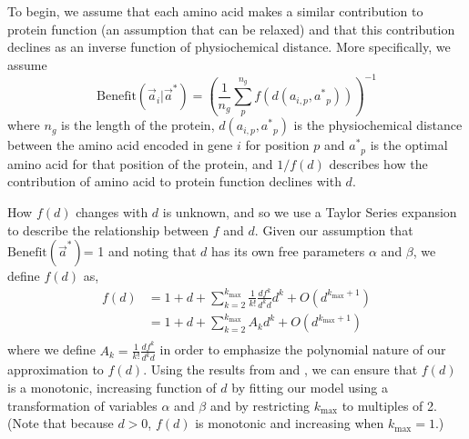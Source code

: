 \documentclass{article}
\newcommand{\kmax}{\ensuremath{{k_{\max}}}\xspace}
\newcommand{\aip}{\ensuremath{a_{i,p}}\xspace}
\newcommand{\aveci}{\ensuremath{\Vec{a}_i}\xspace}
\newcommand{\aopt}{\ensuremath{a^*}\xspace}
\newcommand{\aoptp}{\ensuremath{\aopt_p}\xspace}
\newcommand{\aoptvec}{\ensuremath{\Vec{a}^*}\xspace}
\newcommand{\Func}{\ensuremath{\text{Benefit}}\xspace}
\newcommand{\Funcaveci}{\ensuremath{\Func(\aveci|\aoptvec)}\xspace}
\newcommand{\Funcaoptvec}{\ensuremath{\Func(\aoptvec)}\xspace}
\renewcommand{\ng}{\ensuremath{{n_g}}\xspace}
\begin{document}
To begin, we assume that each amino acid makes a similar contribution to protein function (an assumption that can be relaxed) and that this contribution declines as an inverse function of physiochemical distance.
More specifically, we assume 
\begin{equation}
\Funcaveci = \left(\frac{1}{\ng} \sum_p^\ng{} f\left(d\left(\aip, \aoptp\right)\right)\right)^{-1}
\end{equation}
where $\ng$ is the length of the protein, $d(\aip, \aoptp)$ is the physiochemical distance between the amino acid encoded in gene $i$ for position $p$ and $\aoptp$ is the optimal amino acid for that position of the protein, and $1/f(d)$ describes how the contribution of amino acid to protein function declines with $d$.

How $f(d)$ changes with $d$ is unknown, and so we use a Taylor Series expansion to describe the relationship between $f$ and $d$.
Given our assumption that \Funcaoptvec = 1 and noting that $d$ has its own free parameters $\alpha$ and $\beta$, we define $f(d)$ as,
\begin{align}
  \label{eq:fSeriesDef}
  f(d) &= 1 + d + \sum_{k=2}^\kmax \frac{1}{k!}\frac{d f^k}{d^k d} d^k + O(d^{\kmax+1})\\
  & = 1 + d + \sum_{k=2}^\kmax A_k d^k + O(d^{\kmax+1})\\
\end{align}
where we define $A_k = \frac{1}{k!}\frac{d f^k}{d^k d}$ in order to emphasize the polynomial nature of our approximation to $f(d)$.
Using the results from \citet{Liang07} and \citet{Elphinstone85}, we can ensure that $f(d)$ is a monotonic, increasing function of $d$ by fitting our model using a transformation of variables $\alpha$ and $\beta$ and by restricting \kmax to multiples of 2. (Note that because $d > 0$, $f(d)$ is monotonic and increasing when $\kmax=1$.)
\end{document}
